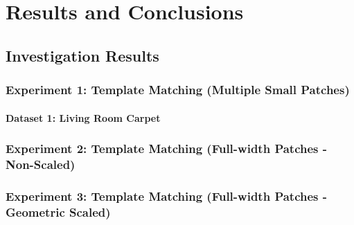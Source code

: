 \chapter{Results and Conclusions}

%
%
%

\section{Investigation Results}

\subsection{Experiment 1: Template Matching (Multiple Small Patches)}

\subsubsection{Dataset 1: Living Room Carpet}

\subsection{Experiment 2: Template Matching (Full-width Patches - Non-Scaled)}


\subsection{Experiment 3: Template Matching (Full-width Patches - Geometric Scaled)}
